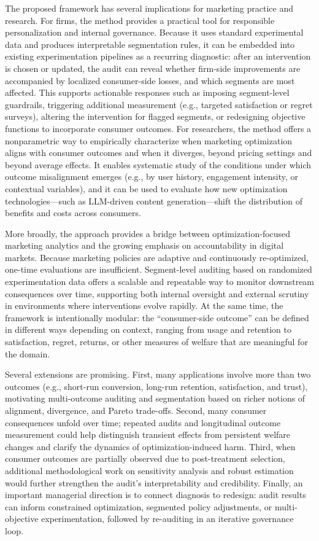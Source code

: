 \documentclass[11pt,letterpaper,english]{article}
\theoremstyle{definition}
\theoremstyle{definition}
\begin{document}
\begin{bibunit}
The proposed framework has several implications for marketing practice and research. For firms, the method provides a practical tool for responsible personalization and internal governance. Because it uses standard experimental data and produces interpretable segmentation rules, it can be embedded into existing experimentation pipelines as a recurring diagnostic: after an intervention is chosen or updated, the audit can reveal whether firm-side improvements are accompanied by localized consumer-side losses, and which segments are most affected. This supports actionable responses such as imposing segment-level guardrails, triggering additional measurement (e.g., targeted satisfaction or regret surveys), altering the intervention for flagged segments, or redesigning objective functions to incorporate consumer outcomes. For researchers, the method offers a nonparametric way to empirically characterize when marketing optimization aligns with consumer outcomes and when it diverges, beyond pricing settings and beyond average effects. It enables systematic study of the conditions under which outcome misalignment emerges (e.g., by user history, engagement intensity, or contextual variables), and it can be used to evaluate how new optimization technologies—such as LLM-driven content generation—shift the distribution of benefits and costs across consumers.

More broadly, the approach provides a bridge between optimization-focused marketing analytics and the growing emphasis on accountability in digital markets. Because marketing policies are adaptive and continuously re-optimized, one-time evaluations are insufficient. Segment-level auditing based on randomized experimentation data offers a scalable and repeatable way to monitor downstream consequences over time, supporting both internal oversight and external scrutiny in environments where interventions evolve rapidly. At the same time, the framework is intentionally modular: the “consumer-side outcome” can be defined in different ways depending on context, ranging from usage and retention to satisfaction, regret, returns, or other measures of welfare that are meaningful for the domain.

Several extensions are promising. First, many applications involve more than two outcomes (e.g., short-run conversion, long-run retention, satisfaction, and trust), motivating multi-outcome auditing and segmentation based on richer notions of alignment, divergence, and Pareto trade-offs. Second, many consumer consequences unfold over time; repeated audits and longitudinal outcome measurement could help distinguish transient effects from persistent welfare changes and clarify the dynamics of optimization-induced harm. Third, when consumer outcomes are partially observed due to post-treatment selection, additional methodological work on sensitivity analysis and robust estimation would further strengthen the audit’s interpretability and credibility. Finally, an important managerial direction is to connect diagnosis to redesign: audit results can inform constrained optimization, segmented policy adjustments, or multi-objective experimentation, followed by re-auditing in an iterative governance loop.


\end{bibunit}
\end{document}
